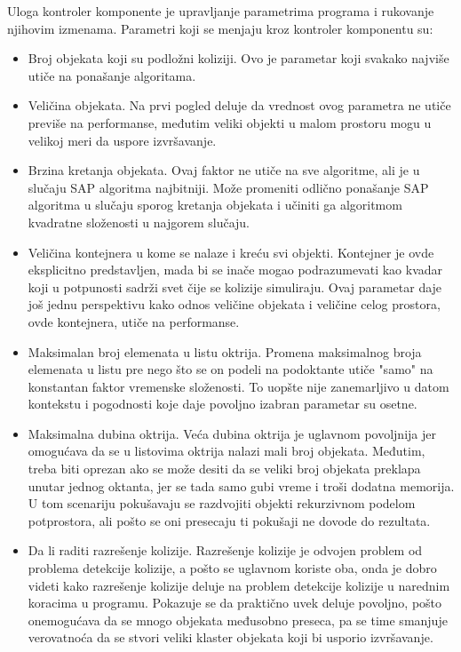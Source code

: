 \documentclass[12pt,oneside]{memoir}
\begin{document}
Uloga kontroler komponente je upravljanje parametrima programa i rukovanje njihovim izmenama.
Parametri koji se menjaju kroz kontroler komponentu su: 
\begin{itemize}  
	\item Broj objekata koji su podložni koliziji. 
	Ovo je parametar koji svakako najviše utiče na ponašanje algoritama.
	\item Veličina objekata. 
	Na prvi pogled deluje da vrednost ovog parametra ne utiče previše na performanse, međutim veliki objekti u malom prostoru mogu u velikoj meri da uspore izvršavanje.
	\item Brzina kretanja objekata.
	Ovaj faktor ne utiče na sve algoritme, ali je u slučaju SAP algoritma najbitniji. Može promeniti odlično ponašanje SAP algoritma u slučaju sporog kretanja 
	objekata i učiniti ga algoritmom kvadratne složenosti u najgorem slučaju.
	\item Veličina kontejnera u kome se nalaze i kreću svi objekti. Kontejner je ovde eksplicitno predstavljen, mada bi se inače mogao podrazumevati kao kvadar 
	koji u potpunosti sadrži svet čije se kolizije simuliraju.
	Ovaj parametar daje još jednu perspektivu kako odnos veličine objekata i veličine celog prostora, ovde kontejnera, utiče na performanse.
	\item Maksimalan broj elemenata u listu oktrija.
	Promena maksimalnog broja elemenata u listu pre nego što se on podeli na podoktante utiče "samo" na konstantan faktor vremenske složenosti.
	To uopšte nije zanemarljivo u datom kontekstu i pogodnosti koje daje povoljno izabran parametar su osetne.
	\item Maksimalna dubina oktrija. Veća dubina oktrija je uglavnom povoljnija jer omogućava da se u listovima oktrija nalazi mali broj objekata.
	Međutim, treba biti oprezan ako se može desiti 
	da se veliki broj objekata preklapa unutar jednog oktanta, jer se tada samo gubi vreme i troši dodatna memorija. 
	U tom scenariju pokušavaju se razdvojiti objekti rekurzivnom podelom potprostora, ali pošto se oni presecaju ti pokušaji ne dovode do rezultata.
	\item Da li raditi razrešenje kolizije. 
	Razrešenje kolizije je odvojen problem od problema detekcije kolizije, a pošto se uglavnom koriste oba, onda je dobro videti 
	kako razrešenje kolizije deluje na problem detekcije kolizije u narednim koracima u programu. Pokazuje se da praktično uvek deluje povoljno, pošto onemogućava da se mnogo 
	objekata međusobno preseca, pa se time smanjuje verovatnoća da se stvori veliki klaster objekata koji bi usporio izvršavanje.

\end{itemize}
\end{document}
